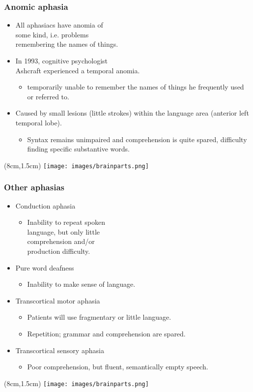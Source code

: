 \documentclass[12pt, table]{beamer}
\begin{document}
\begin{frame}
\frametitle{Anomic aphasia}
\begin{itemize}
\item All aphasiacs have anomia of \\ some kind, i.e. problems \\ remembering the names of things. 
\item In 1993, cognitive psychologist \\ Ashcraft experienced a temporal anomia. 
\begin{itemize}
\item temporarily unable to remember the names of things he frequently used or referred to. 
\end{itemize}
\item Caused by small lesions (little strokes) within the language area (anterior left temporal lobe). 
\begin{itemize}
\item Syntax remains unimpaired and comprehension is quite spared, difficulty finding specific substantive words.
\end{itemize}
\end{itemize}
\begin{textblock*}{8cm}(8cm,1.5cm)
\texttt{[image: images/brainparts.png]}
\end{textblock*}
\end{frame}

\begin{frame}
\frametitle{Other aphasias}
\begin{itemize}
\item Conduction aphasia
\begin{itemize}
\item Inability to repeat spoken \\ language, but only little \\ comprehension and/or \\ production difficulty.
\end{itemize}
\item Pure word deafness
\begin{itemize}
\item Inability to make sense of language.
\end{itemize}
\item Transcortical motor aphasia
\begin{itemize}
\item Patients will use fragmentary or little language. 
\item Repetition; grammar and comprehension are spared.
\end{itemize}
\item Transcortical sensory aphasia
\begin{itemize}
\item Poor comprehension, but fluent, semantically empty speech.
\end{itemize}
\end{itemize}
\begin{textblock*}{8cm}(8cm,1.5cm)
\texttt{[image: images/brainparts.png]}
\end{textblock*}
\end{frame}
\end{document}
